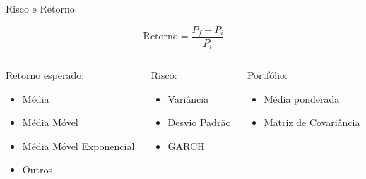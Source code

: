     \begin{frame}{Risco e Retorno}

        \LARGE

        \begin{equation}
            \text{Retorno} = \frac{{P_f-P_i}}{{P_i}}
        \end{equation}

        \begin{columns}
            \begin{column}{0.3\textwidth}


                Retorno esperado:
                \begin{itemize}
                    \item Média
                    \item Média Móvel
                    \item Média Móvel Exponencial
                    \item Outros
                \end{itemize}

            \end{column}
            \begin{column}{0.3\textwidth}

                Risco:
                \begin{itemize}
                    \item Variância
                    \item Desvio Padrão
                    \item GARCH
                \end{itemize}

                \vspace{25pt}

            \end{column}

            \begin{column}{0.3\textwidth}

                Portfólio:
                \begin{itemize}
                    \item Média ponderada
                    \item Matriz de Covariância
                \end{itemize}

                \vspace{25pt}

            \end{column}
        \end{columns}
                

    \end{frame}




